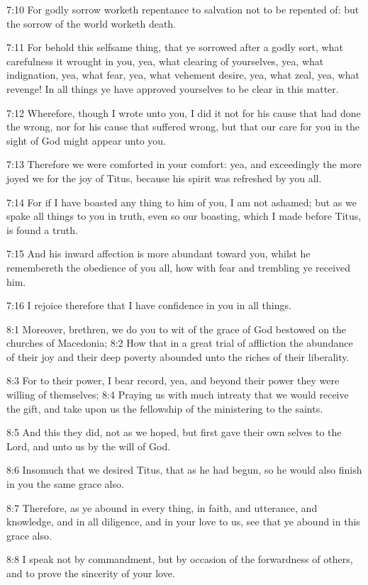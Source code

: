 7:10 For godly sorrow worketh repentance to salvation not to be
repented of: but the sorrow of the world worketh death.

7:11 For behold this selfsame thing, that ye sorrowed after a godly
sort, what carefulness it wrought in you, yea, what clearing of
yourselves, yea, what indignation, yea, what fear, yea, what vehement
desire, yea, what zeal, yea, what revenge! In all things ye have
approved yourselves to be clear in this matter.

7:12 Wherefore, though I wrote unto you, I did it not for his cause
that had done the wrong, nor for his cause that suffered wrong, but
that our care for you in the sight of God might appear unto you.

7:13 Therefore we were comforted in your comfort: yea, and exceedingly
the more joyed we for the joy of Titus, because his spirit was
refreshed by you all.

7:14 For if I have boasted any thing to him of you, I am not ashamed;
but as we spake all things to you in truth, even so our boasting,
which I made before Titus, is found a truth.

7:15 And his inward affection is more abundant toward you, whilst he
remembereth the obedience of you all, how with fear and trembling ye
received him.

7:16 I rejoice therefore that I have confidence in you in all things.

8:1 Moreover, brethren, we do you to wit of the grace of God bestowed
on the churches of Macedonia; 8:2 How that in a great trial of
affliction the abundance of their joy and their deep poverty abounded
unto the riches of their liberality.

8:3 For to their power, I bear record, yea, and beyond their power
they were willing of themselves; 8:4 Praying us with much intreaty
that we would receive the gift, and take upon us the fellowship of the
ministering to the saints.

8:5 And this they did, not as we hoped, but first gave their own
selves to the Lord, and unto us by the will of God.

8:6 Insomuch that we desired Titus, that as he had begun, so he would
also finish in you the same grace also.

8:7 Therefore, as ye abound in every thing, in faith, and utterance,
and knowledge, and in all diligence, and in your love to us, see that
ye abound in this grace also.

8:8 I speak not by commandment, but by occasion of the forwardness of
others, and to prove the sincerity of your love.

